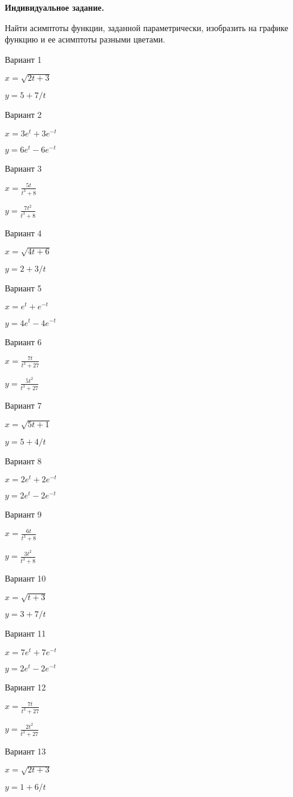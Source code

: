 \documentclass[11pt]{report}
\begin{document}
\pagestyle{empty}

{\bf Индивидуальное задание.}

 
Найти асимптоты функции, заданной параметрически, изобразить на графике функцию и ее асимптоты разными цветами.

Вариант 1

$x = \sqrt{2 t + 3}$

$y = 5 + 7 / t$

Вариант 2

$x = 3 e^{t} + 3 e^{- t}$

$y = 6 e^{t} - 6 e^{- t}$

Вариант 3

$x = \frac{5 t}{t^{3} + 8}$

$y = \frac{7 t^{2}}{t^{3} + 8}$

Вариант 4

$x = \sqrt{4 t + 6}$

$y = 2 + 3 / t$

Вариант 5

$x = e^{t} + e^{- t}$

$y = 4 e^{t} - 4 e^{- t}$

Вариант 6

$x = \frac{7 t}{t^{3} + 27}$

$y = \frac{5 t^{2}}{t^{3} + 27}$

Вариант 7

$x = \sqrt{5 t + 1}$

$y = 5 + 4 / t$

Вариант 8

$x = 2 e^{t} + 2 e^{- t}$

$y = 2 e^{t} - 2 e^{- t}$

Вариант 9

$x = \frac{6 t}{t^{3} + 8}$

$y = \frac{3 t^{2}}{t^{3} + 8}$

Вариант 10

$x = \sqrt{t + 3}$

$y = 3 + 7 / t$

Вариант 11

$x = 7 e^{t} + 7 e^{- t}$

$y = 2 e^{t} - 2 e^{- t}$

Вариант 12

$x = \frac{7 t}{t^{3} + 27}$

$y = \frac{2 t^{2}}{t^{3} + 27}$

Вариант 13

$x = \sqrt{2 t + 3}$

$y = 1 + 6 / t$
\end{document}
